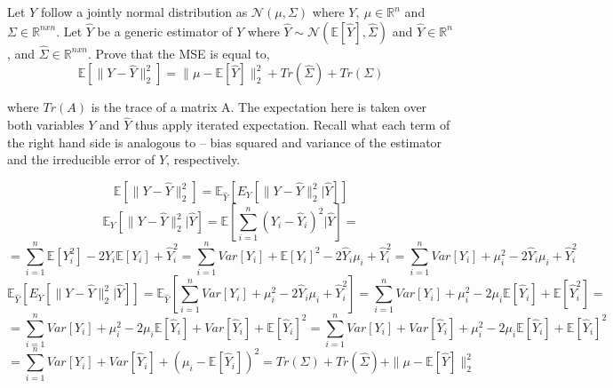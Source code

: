 Let $Y$ follow a jointly normal distribution as $ \mathcal N(\mu,\Sigma)$ where $Y, \ \mu \in \mathbb R^n$ and $\Sigma \in \mathbb R^{nxn} $. Let $\hat Y$ be a generic estimator of $Y$ where $\hat Y \sim \mathcal N(\mathbb E[\hat Y], \hat{\Sigma})$  and $\hat Y \in \mathbb R^n$, and $\hat \Sigma \in \mathbb R^{nxn}$. Prove that the MSE is equal to, 
$$ \mathbb E[\|Y - \hat Y \|^2_2]  = \|\mu - \mathbb E[\hat Y]\|^2_2 + Tr(\hat \Sigma) + Tr(\Sigma)$$

where $Tr(A)$ is the trace of a matrix A. The expectation here is taken over both variables $Y$ and $\hat Y$ thus apply iterated expectation. Recall what each term of the right hand side is analogous to -- bias squared and variance of the estimator and the irreducible error of $Y$, respectively.

\begin{solution}
    $$ \mathbb E[\|Y - \hat Y \|^2_2] = \mathbb E_{\hat Y}[E_{Y}[\|Y - \hat Y \|^2_2|\hat Y]]$$
    $$ \mathbb E_{Y}[\|Y - \hat Y \|^2_2|\hat Y] = \mathbb E[\sum_{i=1}^{n} (Y_i - \hat Y_i)^2 |\hat Y] = $$ 
    $$ = \sum_{i=1}^{n} \mathbb E[Y_i^2] - 2\hat Y_i \mathbb E[Y_i]  + \hat Y_i^2 = \sum_{i=1}^{n} Var[Y_i] + \mathbb E[Y_i]^2 - 2\hat Y_i \mu_i  + \hat Y_i^2 = \sum_{i=1}^{n} Var[Y_i] + \mu_i^2 - 2\hat Y_i \mu_i  + \hat Y_i^2
    $$
    $$ \mathbb E_{\hat Y}[E_{Y}[\|Y - \hat Y \|^2_2|\hat Y]] = \mathbb E_{\hat Y} [\sum_{i=1}^{n} Var[Y_i] + \mu_i^2 - 2\hat Y_i \mu_i  + \hat Y_i^2] = \sum_{i=1}^{n} Var[Y_i] + \mu_i^2 - 2\mu_i \mathbb E[\hat Y_i]   + \mathbb E[\hat Y_i^2] =
    $$
    $$ = \sum_{i=1}^{n} Var[Y_i] + \mu_i^2 - 2\mu_i \mathbb E[\hat Y_i]   + Var[\hat Y_i] + \mathbb E[\hat Y_i]^2 = \sum_{i=1}^{n} Var[Y_i] + Var[\hat Y_i] + \mu_i^2 - 2\mu_i \mathbb E[\hat Y_i] + \mathbb E[\hat Y_i]^2
    $$
    $$ = \sum_{i=1}^{n} Var[Y_i] + Var[\hat Y_i] + (\mu_i - \mathbb E[\hat Y_i])^2 = Tr(\Sigma) + Tr(\hat \Sigma) + \|\mu - \mathbb E[\hat Y]\|_2^2
    $$
\end{solution}




